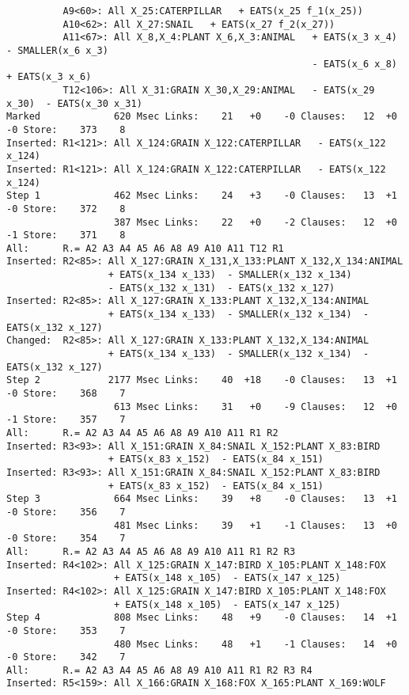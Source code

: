 {\begin{verbatim}
          A9<60>: All X_25:CATERPILLAR   + EATS(x_25 f_1(x_25))
          A10<62>: All X_27:SNAIL   + EATS(x_27 f_2(x_27))
          A11<67>: All X_8,X_4:PLANT X_6,X_3:ANIMAL   + EATS(x_3 x_4)  - SMALLER(x_6 x_3)  
                                                      - EATS(x_6 x_8)  + EATS(x_3 x_6)
          T12<106>: All X_31:GRAIN X_30,X_29:ANIMAL   - EATS(x_29 x_30)  - EATS(x_30 x_31)
Marked             620 Msec Links:    21   +0    -0 Clauses:   12  +0  -0 Store:    373    8
Inserted: R1<121>: All X_124:GRAIN X_122:CATERPILLAR   - EATS(x_122 x_124)
Inserted: R1<121>: All X_124:GRAIN X_122:CATERPILLAR   - EATS(x_122 x_124)
Step 1             462 Msec Links:    24   +3    -0 Clauses:   13  +1  -0 Store:    372    8
                   387 Msec Links:    22   +0    -2 Clauses:   12  +0  -1 Store:    371    8
All:      R.= A2 A3 A4 A5 A6 A8 A9 A10 A11 T12 R1 
Inserted: R2<85>: All X_127:GRAIN X_131,X_133:PLANT X_132,X_134:ANIMAL
                  + EATS(x_134 x_133)  - SMALLER(x_132 x_134)
                  - EATS(x_132 x_131)  - EATS(x_132 x_127)
Inserted: R2<85>: All X_127:GRAIN X_133:PLANT X_132,X_134:ANIMAL 
                  + EATS(x_134 x_133)  - SMALLER(x_132 x_134)  - EATS(x_132 x_127)
Changed:  R2<85>: All X_127:GRAIN X_133:PLANT X_132,X_134:ANIMAL   
                  + EATS(x_134 x_133)  - SMALLER(x_132 x_134)  - EATS(x_132 x_127)
Step 2            2177 Msec Links:    40  +18    -0 Clauses:   13  +1  -0 Store:    368    7
                   613 Msec Links:    31   +0    -9 Clauses:   12  +0  -1 Store:    357    7
All:      R.= A2 A3 A4 A5 A6 A8 A9 A10 A11 R1 R2 
Inserted: R3<93>: All X_151:GRAIN X_84:SNAIL X_152:PLANT X_83:BIRD   
                  + EATS(x_83 x_152)  - EATS(x_84 x_151)
Inserted: R3<93>: All X_151:GRAIN X_84:SNAIL X_152:PLANT X_83:BIRD   
                  + EATS(x_83 x_152)  - EATS(x_84 x_151)
Step 3             664 Msec Links:    39   +8    -0 Clauses:   13  +1  -0 Store:    356    7
                   481 Msec Links:    39   +1    -1 Clauses:   13  +0  -0 Store:    354    7
All:      R.= A2 A3 A4 A5 A6 A8 A9 A10 A11 R1 R2 R3 
Inserted: R4<102>: All X_125:GRAIN X_147:BIRD X_105:PLANT X_148:FOX   
                   + EATS(x_148 x_105)  - EATS(x_147 x_125)
Inserted: R4<102>: All X_125:GRAIN X_147:BIRD X_105:PLANT X_148:FOX   
                   + EATS(x_148 x_105)  - EATS(x_147 x_125)
Step 4             808 Msec Links:    48   +9    -0 Clauses:   14  +1  -0 Store:    353    7
                   480 Msec Links:    48   +1    -1 Clauses:   14  +0  -0 Store:    342    7
All:      R.= A2 A3 A4 A5 A6 A8 A9 A10 A11 R1 R2 R3 R4 
Inserted: R5<159>: All X_166:GRAIN X_168:FOX X_165:PLANT X_169:WOLF   

\end{verbatim}}
